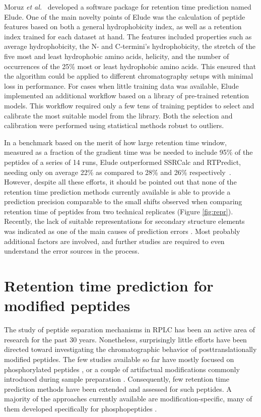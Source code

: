 \documentclass[a4paper]{article}
\begin{document}
Moruz {\em et al.}~\cite{elude1} developed a software package for
retention time prediction named {\sc Elude}. One of the main novelty
points of {\sc Elude} was the calculation of peptide features based on
both a general hydrophobicity index, as well as a retention index
trained for each dataset at hand. The features included properties
such as average hydrophobicity, the N- and C-termini's hydrophobicity,
the stretch of the five most and least hydrophobic amino acids,
helicity, and the number of occurrences of the 25\% most or least
hydrophobic amino acids. This ensured that the algorithm could be
applied to different chromatography setups with minimal loss in
performance. For cases when little training data was available, {\sc
Elude} implemented an additional workflow based on a library of
pre-trained retention models. This workflow required only a few tens
of training peptides to select and calibrate the most suitable model
from the library. Both the selection and calibration were performed
using statistical methods robust to outliers. 


In a benchmark based on the merit of how large retention time window,
measured as a fraction of the gradient time was be needed to include
95\% of the peptides of a series of 14 runs, {\sc Elude} outperformed
{\sc SSRCalc} and {\sc RTPredict}, needing only on average 22\% as
compared to 28\% and 26\% respectively~\cite{elude1}. However, despite
all these efforts, it should be pointed out that none of the retention
time prediction methods currently available is able to provide a
prediction precision comparable to the small shifts observed when
comparing retention time of peptides from two technical replicates
(Figure \ref{fig:repr}). Recently, the lack of suitable
representations for secondary structure elements was indicated as one
of the main causes of prediction errors \cite{Reimer2012}.  Most
probably additional factors are involved, and further studies are
required to even understand the error sources in the process.

\section{\label{sec:rtpredm}Retention time prediction for modified peptides}

The study of peptide separation mechanisms in RPLC has been an active
area of research for the past 30 years. Nonetheless, surprisingly
little efforts have been directed toward investigating the
chromatographic behavior of posttranslationally modified peptides. The
few studies available so far have mostly focused on phosphorylated
peptides \cite{Kim2007}, or a couple of artifactual modifications
commonly introduced during sample preparation
\cite{Reimer2011}. Consequently, few retention time prediction methods
have been extended and assessed for such peptides. A majority of the
approaches currently available are modification-specific, many of them
developed specifically for phosphopeptides \cite{Kawakami2005,
  perlova2010}.
\end{document}
